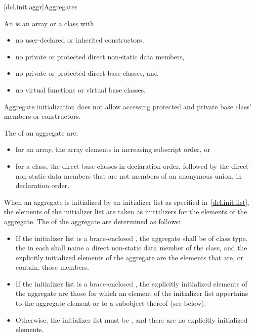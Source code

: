 [dcl.init.aggr]{Aggregates}%
%
%
%
%
%
%

\pnum
An  is an array or a class with
\begin{itemize}
\item
no user-declared or inherited constructors,
\item
no private or protected direct non-static data members,
\item
no private or protected direct base classes, and
\item
no virtual functions or virtual base classes.
\end{itemize}
\begin{note}
Aggregate initialization does not allow accessing
protected and private base class' members or constructors.
\end{note}

\pnum
The  of an aggregate are:
\begin{itemize}
\item
for an array, the array elements in increasing subscript order, or
\item
for a class, the direct base classes in declaration order,
followed by the direct non-static data members
that are not members of an anonymous union, in declaration order.
\end{itemize}

\pnum
When an aggregate is initialized by an initializer list
as specified in~\ref{dcl.init.list},
the elements of the initializer list are taken as initializers
for the elements of the aggregate.
The 
of the aggregate are determined as follows:
\begin{itemize}
\item
If the initializer list is
a brace-enclosed ,
the aggregate shall be of class type,
the  in each 
shall name a direct non-static data member of the class, and
the explicitly initialized elements of the aggregate
are the elements that are, or contain, those members.
\item
If the initializer list is a brace-enclosed ,
the explicitly initialized elements of the aggregate
are those for which an element of the initializer list
appertains to the aggregate element or to a subobject thereof (see below).
\item
Otherwise, the initializer list must be \tcode{\{\}},
and there are no explicitly initialized elements.
\end{itemize}

